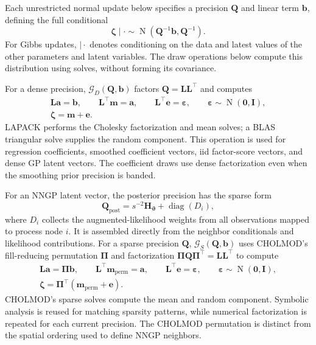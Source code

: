 \documentclass[11pt]{article}
\newcommand{\ba}{\bm{a}}
\newcommand{\bb}{\bm{b}}
\newcommand{\beps}{\bm{\varepsilon}}
\newcommand{\bI}{\bm{I}}
\newcommand{\bL}{\bm{L}}
\newcommand{\bQ}{\bm{Q}}
\newcommand{\bzero}{\bm{0}}
\newcommand{\bH}{\bm{H}}
\newcommand{\trans}{^\top}
\newcommand{\Normal}{\operatorname{N}}
\begin{document}
Each unrestricted normal update below specifies a precision \(\bQ\) and
linear term \(\bb\), defining the full conditional
\begin{equation}
 \boldsymbol\zeta\mid\cdot\sim\Normal(\bQ^{-1}\bb,\bQ^{-1}).
 \label{eq:gaussian-full-conditional}
\end{equation}
For Gibbs updates, \(\mid\cdot\) denotes conditioning on the data and latest
values of the other parameters and latent variables. The draw operations
below compute this distribution using solves, without forming its covariance.

For a dense precision, \(\mathcal G_D(\bQ,\bb)\) factors
\(\bQ=\bL\bL\trans\) and computes
\begin{equation}
 \begin{gathered}
  \bL\ba=\bb,\qquad \bL\trans\boldsymbol m=\ba,\qquad
  \bL\trans\boldsymbol e=\beps,\qquad \beps\sim\Normal(\bzero,\bI),\\
  \boldsymbol\zeta=\boldsymbol m+\boldsymbol e.
 \end{gathered}
 \label{eq:precision-draw}
\end{equation}
LAPACK performs the Cholesky factorization and mean solves; a BLAS triangular
solve supplies the random component. This operation is used for regression
coefficients, smoothed coefficient vectors, iid factor-score vectors, and
dense GP latent vectors. The coefficient draws use dense factorization even
when the smoothing prior precision is banded.

For an NNGP latent vector, the posterior precision has the sparse form
\begin{equation}
 \bQ_{\mathrm{post}}=s^{-2}\bH_{\boldsymbol\vartheta}+\operatorname{diag}(D_i),
 \label{eq:nngp-posterior-precision}
\end{equation}
where \(D_i\) collects the augmented-likelihood weights from all observations
mapped to process node \(i\).
It is assembled directly from the neighbor conditionals and likelihood
contributions. For a sparse precision \(\bQ\),
\(\mathcal G_S(\bQ,\bb)\) uses CHOLMOD's fill-reducing permutation
\(\boldsymbol\Pi\) and factorization
\(\boldsymbol\Pi\bQ\boldsymbol\Pi\trans=\bL\bL\trans\) to compute
\begin{equation}
 \begin{gathered}
  \bL\ba=\boldsymbol\Pi\bb,\qquad
  \bL\trans\boldsymbol m_{\mathrm{perm}}=\ba,\qquad
  \bL\trans\boldsymbol e=\beps,\qquad \beps\sim\Normal(\bzero,\bI),\\
  \boldsymbol\zeta=\boldsymbol\Pi\trans
       (\boldsymbol m_{\mathrm{perm}}+\boldsymbol e).
 \end{gathered}
 \label{eq:sparse-precision-draw}
\end{equation}
CHOLMOD's sparse solves compute the mean and random component. Symbolic
analysis is reused for matching sparsity patterns, while numerical
factorization is repeated for each current precision. The CHOLMOD permutation
is distinct from the spatial ordering used to define NNGP neighbors.
\end{document}
